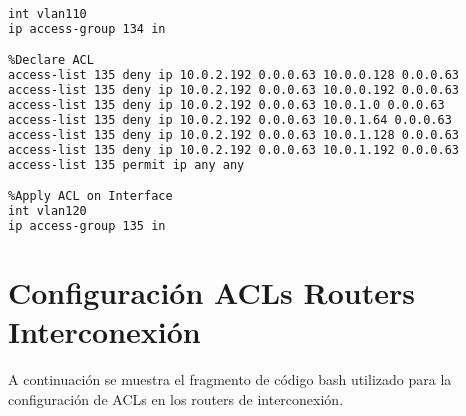 \begin{lstlisting}[language=Bash, caption={Configuración ACLs Switches Distribución}]
%Apply ACL on Interface
int vlan110
ip access-group 134 in

%Declare ACL
access-list 135 deny ip 10.0.2.192 0.0.0.63 10.0.0.128 0.0.0.63
access-list 135 deny ip 10.0.2.192 0.0.0.63 10.0.0.192 0.0.0.63
access-list 135 deny ip 10.0.2.192 0.0.0.63 10.0.1.0 0.0.0.63
access-list 135 deny ip 10.0.2.192 0.0.0.63 10.0.1.64 0.0.0.63
access-list 135 deny ip 10.0.2.192 0.0.0.63 10.0.1.128 0.0.0.63
access-list 135 deny ip 10.0.2.192 0.0.0.63 10.0.1.192 0.0.0.63
access-list 135 permit ip any any

%Apply ACL on Interface
int vlan120
ip access-group 135 in
\end{lstlisting}

\section{Configuración ACLs Routers Interconexión}\label{anexo:aclint}
A continuación se muestra el fragmento de código bash utilizado para la configuración de ACLs en los routers de interconexión.

